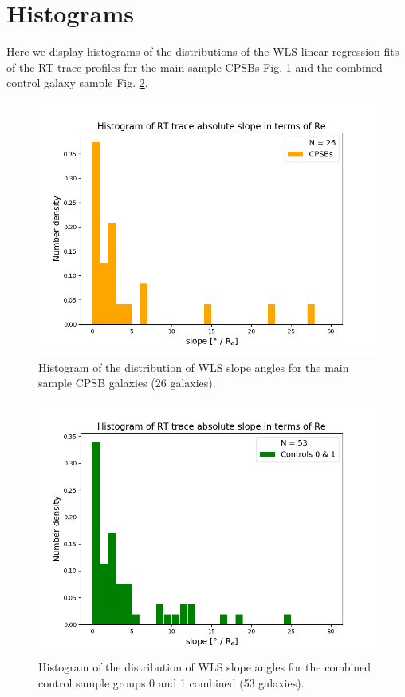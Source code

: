 \section{Histograms}
Here we display histograms of the distributions of the WLS linear regression fits of the RT trace profiles for the main sample CPSBs Fig. \ref{fig:CPSBsRe} and the combined control galaxy sample Fig. \ref{fig:Controls0+1Re}.

\begin{figure}
    \centering
    \includegraphics[width=\columnwidth]{Images/HISTOS/CPSBsRe.png}
    \caption{Histogram of the distribution of WLS slope angles for the main sample CPSB galaxies (26 galaxies).}
    \label{fig:CPSBsRe}
\end{figure}

\begin{figure}
    \centering
    \includegraphics[width=\columnwidth]{Images/HISTOS/Controls0+1Re.png}
    \caption{Histogram of the distribution of WLS slope angles for the combined control sample groups 0 and 1 combined (53 galaxies).}
    \label{fig:Controls0+1Re}
\end{figure}

